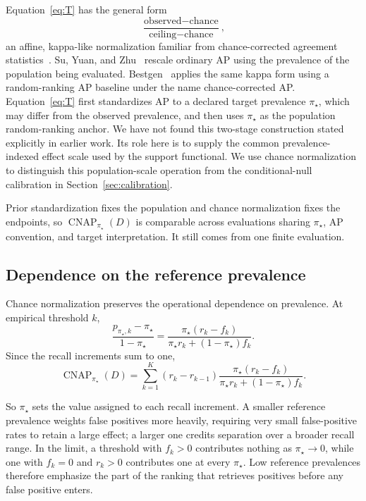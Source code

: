 \documentclass[11pt]{article}
\newcommand{\CNAP}{\operatorname{CNAP}}
\newcommand{\Tpi}{\CNAP_{\pi_\star}}
\theoremstyle{remark}
\begin{document}
Equation~\eqref{eq:T} has the general form
\begin{equation}
\frac{\text{observed}-\text{chance}}{\text{ceiling}-\text{chance}},
\label{eq:kappa-form}
\end{equation}
an affine, kappa-like normalization familiar from chance-corrected agreement statistics~\cite{cohen1960coefficient}. Su, Yuan, and Zhu~\cite{suyuan2015relationship} rescale ordinary AP using the prevalence of the population being evaluated. Bestgen~\cite{bestgen2021fisher} applies the same kappa form using a random-ranking AP baseline under the name chance-corrected AP. Equation~\eqref{eq:T} first standardizes AP to a declared target prevalence $\pi_\star$, which may differ from the observed prevalence, and then uses $\pi_\star$ as the population random-ranking anchor. We have not found this two-stage construction stated explicitly in earlier work. Its role here is to supply the common prevalence-indexed effect scale used by the support functional. We use chance normalization to distinguish this population-scale operation from the conditional-null calibration in Section~\ref{sec:calibration}.

Prior standardization fixes the population and chance normalization fixes the endpoints, so $\Tpi(D)$ is comparable across evaluations sharing $\pi_\star$, AP convention, and target interpretation. It still comes from one finite evaluation.

\subsection{Dependence on the reference prevalence}

Chance normalization preserves the operational dependence on prevalence. At empirical threshold $k$,
\begin{equation}
\frac{p_{\pi_\star,k}-\pi_\star}{1-\pi_\star}
=
\frac{\pi_\star(r_k-f_k)}
{\pi_\star r_k+(1-\pi_\star)f_k}.
\label{eq:threshold-normalized-effect}
\end{equation}
Since the recall increments sum to one,
\begin{equation}
\Tpi(D)
=
\sum_{k=1}^{K}
(r_k-r_{k-1})
\frac{\pi_\star(r_k-f_k)}
{\pi_\star r_k+(1-\pi_\star)f_k}.
\label{eq:T-reference-dependence}
\end{equation}

So $\pi_\star$ sets the value assigned to each recall increment. A smaller reference prevalence weights false positives more heavily, requiring very small false-positive rates to retain a large effect; a larger one credits separation over a broader recall range. In the limit, a threshold with $f_k>0$ contributes nothing as $\pi_\star\to0$, while one with $f_k=0$ and $r_k>0$ contributes one at every $\pi_\star$. Low reference prevalences therefore emphasize the part of the ranking that retrieves positives before any false positive enters.
\end{document}
